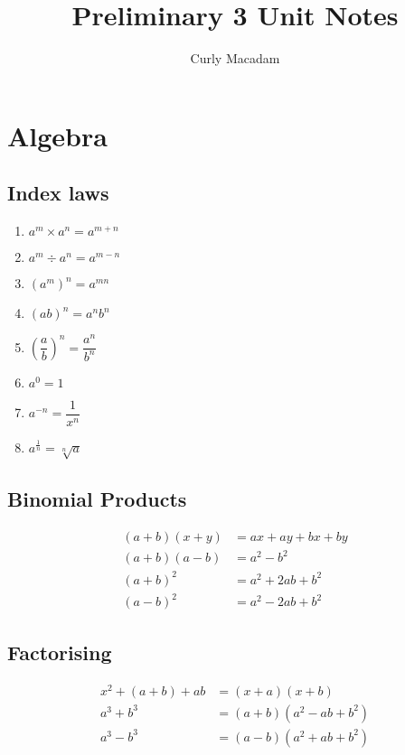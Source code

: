 \documentclass[a4paper, draft]{article}
\title{Preliminary 3 Unit Notes}
\author{Curly Macadam}
\date{}
\begin{document}
\maketitle
\section{Algebra}
\subsection{Index laws}
\begin{enumerate}
\item \(a^m \times a^n = a^{m+n}\)
\item \(a^m \div a^n = a^{m-n}\)
\item \((a^m)^n = a^{mn}\)
\item \((ab)^n = a^{n}b^{n}\)
\item \(\left(\dfrac{a}{b}\right)^n = \dfrac{a^n}{b^n}\)
\item \(a^0 = 1\)
\item \(a^{-n} = \dfrac{1}{x^n}\)
\item \(a^{\frac{1}{n}} = \sqrt[n]{a}\)
\end{enumerate}
\subsection{Binomial Products}
\[\begin{align*}
(a+b)(x+y) &= ax + ay + bx + by \\
(a+b)(a-b) &= a^2 - b^2 \\
(a+b)^2 &= a^2 + 2ab + b^2 \\
(a-b)^2 &= a^2 - 2ab + b^2
\end{align*}\]
\subsection{Factorising}
\[\begin{align*}
x^2 + (a+b) + ab &= (x+a)(x+b) \\
a^3 + b^3 &= (a+b)(a^2 - ab + b^2) \\
a^3 - b^3 &= (a-b)(a^2 + ab + b^2)
\end{align*}
\]
\end{document}
